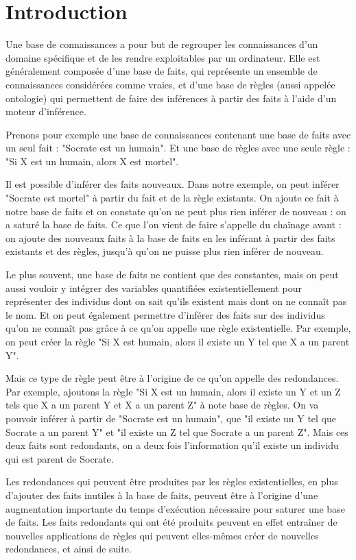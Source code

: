 \section{Introduction}

Une base de connaissances a pour but de regrouper les connaissances d'un domaine spécifique et de les rendre exploitables par un ordinateur. Elle est généralement composée d'une base de faits, qui représente un ensemble de connaissances considérées comme vraies, et d'une base de règles (aussi appelée ontologie) qui permettent de faire des inférences à partir des faits à l'aide d'un moteur d'inférence.
\par Prenons pour exemple une base de connaissances contenant une base de faits avec un seul fait : "Socrate est un humain". Et une base de règles avec une seule règle : "Si X est un humain, alors X est mortel". 
\par Il est possible d'inférer des faits nouveaux. Dans notre exemple, on peut inférer "Socrate est mortel" à partir du fait et de la règle existants. On ajoute ce fait à notre base de faits et on constate qu'on ne peut plus rien inférer de nouveau : on a saturé la base de faits. Ce que l'on vient de faire s'appelle du chaînage avant : on ajoute des nouveaux faits à la base de faits en les inférant à partir des faits existants et des règles, jusqu'à qu'on ne puisse plus rien inférer de nouveau. 
\par Le plus souvent, une base de faits ne contient que des constantes, mais on peut aussi vouloir y intégrer des variables quantifiées existentiellement pour représenter des individus dont on sait qu'ils existent mais dont on ne connaît pas le nom. Et on peut également permettre d'inférer des faits sur des individus qu'on ne connaît pas grâce à ce qu'on appelle une règle existentielle. Par exemple, on peut créer la règle "Si X est humain, alors il existe un Y tel que X a un parent Y".
\par Mais ce type de règle peut être à l'origine de ce qu'on appelle des redondances. Par exemple, ajoutons la règle "Si X est un humain, alors il existe un Y et un Z tels que X a un parent Y et X a un parent Z" à note base de règles. On va pouvoir inférer à partir de "Socrate est un humain", que "il existe un Y tel que Socrate a un parent Y" et "il existe un Z tel que Socrate a un parent Z". Mais ces deux faits sont redondants, on a deux fois l'information qu'il existe un individu qui est parent de Socrate.
\par Les redondances qui peuvent être produites par les règles existentielles, en plus d'ajouter des faits inutiles à la base de faits, peuvent être à l'origine d'une augmentation importante du temps d'exécution nécessaire pour saturer une base de faits. Les faits redondants qui ont été produits peuvent en effet entraîner de nouvelles applications de règles qui peuvent elles-mêmes créer de nouvelles redondances, et ainsi de suite.
